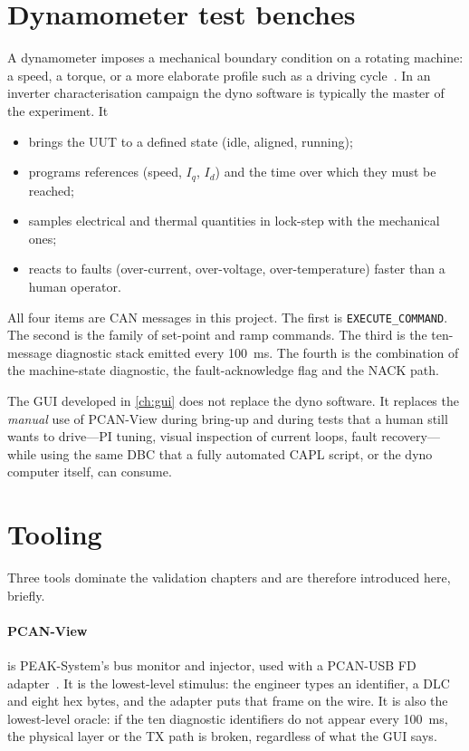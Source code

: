 \section{Dynamometer test benches}
\label{sec:dyno}

A dynamometer imposes a mechanical boundary condition on a rotating
machine: a speed, a torque, or a more elaborate profile such as a driving
cycle~\cite{isermann2014engine}. In an inverter characterisation campaign
the dyno software is typically the master of the experiment. It

\begin{itemize}[leftmargin=1.6em]
  \item brings the UUT to a defined state (idle, aligned, running);
  \item programs references (speed, $I_q$, $I_d$) and the time over which
        they must be reached;
  \item samples electrical and thermal quantities in lock-step with the
        mechanical ones;
  \item reacts to faults (over-current, over-voltage, over-temperature)
        faster than a human operator.
\end{itemize}

All four items are CAN messages in this project. The first is
\texttt{EXECUTE\_COMMAND}. The second is the family of set-point and ramp
commands. The third is the ten-message diagnostic stack emitted every
\SI{100}{\milli\second}. The fourth is the combination of the machine-state
diagnostic, the fault-acknowledge flag and the NACK path.

The GUI developed in \cref{ch:gui} does not replace the dyno software. It
replaces the \emph{manual} use of PCAN-View during bring-up and during
tests that a human still wants to drive---PI tuning, visual inspection of
current loops, fault recovery---while using the same DBC that a fully
automated CAPL script, or the dyno computer itself, can consume.

\section{Tooling}
\label{sec:tools}

Three tools dominate the validation chapters and are therefore introduced
here, briefly.

\paragraph{PCAN-View} is PEAK-System's bus monitor and injector, used with
a PCAN-USB FD adapter~\cite{pcanview}. It is the lowest-level stimulus:
the engineer types an identifier, a DLC and eight hex bytes, and the
adapter puts that frame on the wire. It is also the lowest-level oracle:
if the ten diagnostic identifiers do not appear every \SI{100}{\milli\second},
the physical layer or the TX path is broken, regardless of what the GUI
says.

